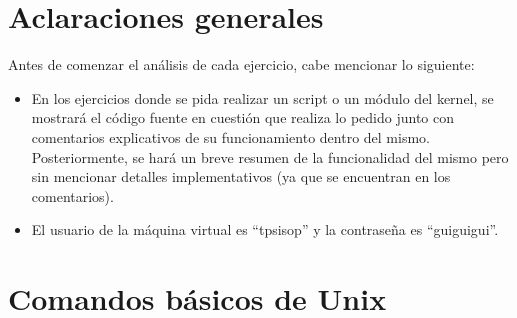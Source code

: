 \documentclass[a4paper,11pt] {article}
\begin{document}

\maketitle

\bigskip
\section*{Aclaraciones generales}

Antes de comenzar el an\'alisis de cada ejercicio, cabe mencionar lo siguiente: 

\begin{itemize}
 \item En los ejercicios donde se pida realizar un script o un módulo del kernel, se mostrará el código fuente en cuestión que realiza lo pedido junto con comentarios explicativos de su funcionamiento dentro del mismo. Posteriormente, se hará un breve resumen de la funcionalidad del mismo pero sin mencionar detalles implementativos (ya que se encuentran en los comentarios).
 \item El usuario de la máquina virtual es ``tpsisop'' y la contraseña es ``guiguigui''.
\end{itemize}

\section{Comandos b\'asicos de Unix}
\end{document}
